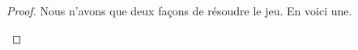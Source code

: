  \label{config-1-1}


\begin{proof}
    Nous n'avons que deux façons de résoudre le jeu. En voici une.
    \begin{mvts}
        \medskip
        \item  {}

        \medskip
        \item  {}

        \medskip
        \item  {}

        \medskip
        \item  {}
    \end{mvts}
\end{proof}
